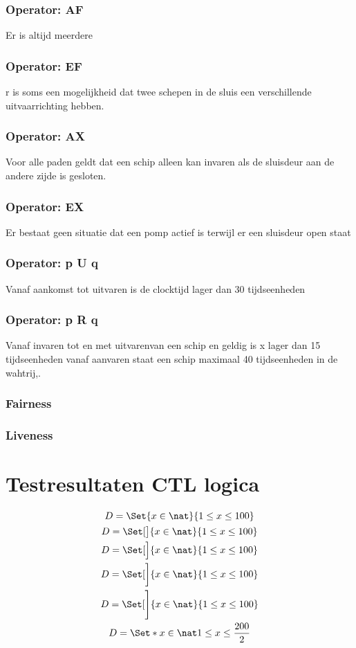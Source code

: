  \subsection{Operator: AF}
 Er is altijd meerdere
 \subsection{Operator: EF}
 r is soms een mogelijkheid dat twee schepen in de sluis een verschillende uitvaarrichting hebben.
 \subsection{Operator: AX}
 Voor alle paden geldt dat een schip alleen kan invaren als de sluisdeur aan de andere zijde is gesloten.
 \subsection{Operator: EX}
 Er bestaat geen situatie dat een pomp actief is terwijl er een sluisdeur open staat
 \subsection{Operator: p U q}
 Vanaf aankomst tot uitvaren is de clocktijd lager dan 30 tijdseenheden 
 \subsection{Operator: p R q}
 Vanaf invaren tot en met uitvarenvan een schip en geldig is x lager dan 15 tijdseenheden
 vanaf aanvaren staat een schip maximaal 40 tijdseenheden in de wahtrij,.
 
 \subsection{Fairness}
 
 \subsection{Liveness}
 
 
 
 
 \chapter{Testresultaten CTL logica}
 
 
 
 \begin{center}
 	\begin{gather*}
 		D=\Set{x\in\nat}{1\le x\le 100}\\
 		D=\Set[\big]{x\in\nat}{1\le x\le 100}\\
 		D=\Set[\Big]{x\in\nat}{1\le x\le 100}\\
 		D=\Set[\bigg]{x\in\nat}{1\le x\le 100}\\
 		D=\Set[\Bigg]{x\in\nat}{1\le x\le 100}\\
 		D=\Set*{x\in\nat}{1\le x\le \frac{200}{2}}
 	\end{gather*}
 \end{center}
 
